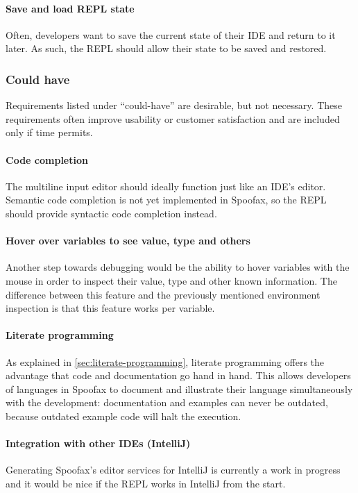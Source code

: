 \paragraph{Save and load REPL state} Often, developers want to save the current
state of their IDE and return to it later. As such, the REPL should allow their
state to be saved and restored.

\subsubsection{Could have}

Requirements listed under ``could-have'' are desirable, but not necessary.
These requirements often improve usability or customer satisfaction and are
included only if time permits.

\paragraph{Code completion} The multiline input editor should ideally function
just like an IDE's editor. Semantic code completion is not yet implemented in
Spoofax, so the REPL should provide syntactic code completion instead.

\paragraph{Hover over variables to see value, type and others} Another step
towards debugging would be the ability to hover variables with the mouse in
order to inspect their value, type and other known information. The difference
between this feature and the previously mentioned environment inspection is that
this feature works per variable.

\paragraph{Literate programming} As explained in
\cref{sec:literate-programming}, literate programming offers the advantage that
code and documentation go hand in hand. This allows developers of languages in
Spoofax to document and illustrate their language simultaneously with the
development: documentation and examples can never be outdated, because outdated
example code will halt the execution.

\paragraph{Integration with other IDEs (IntelliJ)} Generating Spoofax's editor
services for IntelliJ is currently a work in progress and it would be nice if
the REPL works in IntelliJ from the start.

